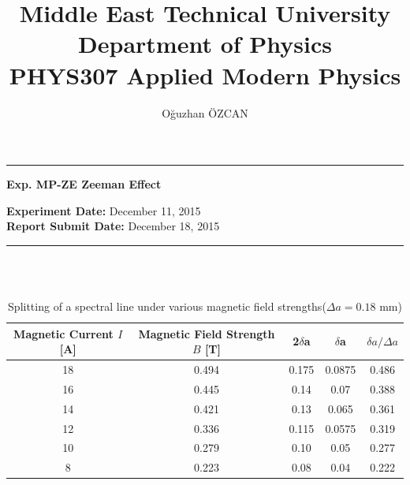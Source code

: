\documentclass[a4paper,12pt]{article}
\title{Middle East Technical University\\Department of Physics\\\textbf{PHYS307 Applied Modern Physics}}
\author{Oğuzhan ÖZCAN\\}
\date{}
\providecommand{\expdate}[1]{\textbf{Experiment Date:} }
\providecommand{\repdate}[1]{\textbf{Report Submit Date:} }
\providecommand{\expname}[1]{\textbf{Exp. MP-ZE Zeeman Effect} }
\begin{document}
\maketitle

\thispagestyle{fancy}

\noindent\rule{18.4cm}{0.8pt}
\begin{center}
	\expname{arg1}{}
\end{center}

\expdate{November 6, 2015}{December 11, 2015}\\
\repdate{arg1}{December 18, 2015}\\
\noindent\rule{18.4cm}{0.8pt}\\\\
\begin{table}[h!]
\begin{center}
	\begin{tabular}{|c|c|c|c|c|}
	\hline \textbf{Magnetic Current $I$ [A]}  &\textbf{ Magnetic Field Strength $B$ [T]} & 2$\delta$a & $\delta$a & $\delta a / \Delta a$ \\ 
	\hline 18 & 0.494 & 0.175 & 0.0875 & 0.486 \\ 
	\hline 16 & 0.445 & 0.14 & 0.07 & 0.388 \\ 
	\hline 14 & 0.421 & 0.13 & 0.065 & 0.361 \\ 
	\hline 12 & 0.336 & 0.115 & 0.0575 & 0.319 \\ 
	\hline 10 & 0.279 & 0.10 & 0.05 & 0.277 \\ 
	\hline 8 & 0.223 & 0.08 & 0.04 & 0.222 \\ 
	\hline 
\end{tabular} 
\end{center}
\caption{Splitting of a spectral line under various magnetic field strengths($\Delta a=0.18$ mm)}
\end{table}
\end{document}
